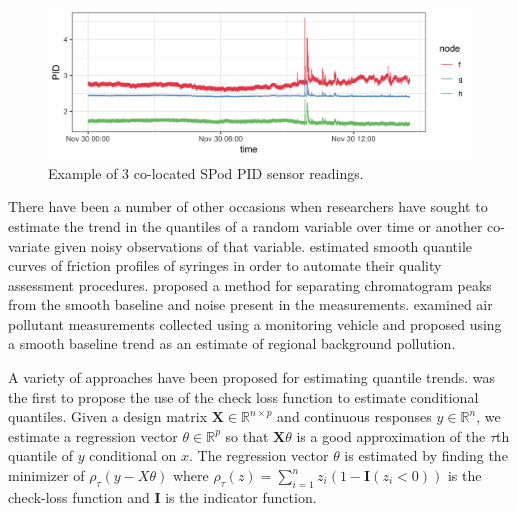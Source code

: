\documentclass[12pt]{article}
\begin{document}
	\begin{figure}[b!]
		\label{fig:raw_spod}
		\caption{Example of 3 co-located SPod PID sensor readings.}
		\includegraphics[width = \linewidth]{Figures/uncorrected_data.png}
	\end{figure}

	There have been a number of other occasions when researchers have sought to estimate the trend in the quantiles of a random variable over time or another co-variate given noisy observations of that variable. \cite{nychka1995nonparametric} estimated smooth quantile curves of friction profiles of syringes in order to automate their quality assessment procedures. \cite{Ning2014} proposed a method for separating chromatogram peaks from the smooth baseline and noise present in the measurements. \cite{brantley2014mobile} examined air pollutant measurements collected using a monitoring vehicle and proposed using a smooth baseline trend as an estimate of regional background pollution.    	
	
	A variety of approaches have been proposed for estimating quantile trends. \cite{Koenker1978} was the first to propose the use of the check loss function to estimate conditional quantiles. Given a design matrix $\mathbf{X} \in \mathbb{R}^{n \times p}$ and continuous responses $y \in \mathbb{R}^n$, we estimate a regression vector $\theta \in \mathbb{R}^p$ so that $\mathbf{X}\theta$ is a good approximation of the $\tau$th quantile of $y$ conditional on $x$. The regression vector $\theta$ is estimated by finding the minimizer of $\rho_{\tau}(y-X\theta)$ where $\rho_{\tau}(z) = \sum_{i=1}^n z_i(1-\mathbf{I}(z_i<0))$ is the check-loss function and $\mathbf{I}$ is the indicator function.  
	
\end{document}

